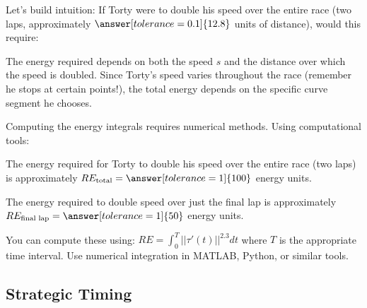 \documentclass{ximera}
\begin{document}
\begin{problem}
    Let's build intuition: If Torty were to double his speed over the entire race (two laps, approximately $\answer[tolerance=0.1]{12.8}$ units of distance), would this require:
    \begin{multipleChoice}
    \end{multipleChoice}
    
    \begin{feedback}
        The energy required depends on both the speed $s$ and the distance over which the speed is doubled. Since Torty's speed varies throughout the race (remember he stops at certain points!), the total energy depends on the specific curve segment he chooses.
    \end{feedback}
\end{problem}

\begin{problem}
    Computing the energy integrals requires numerical methods. Using computational tools:
    
    The energy required for Torty to double his speed over the entire race (two laps) is approximately $RE_{\text{total}}=\answer[tolerance=1]{100}$ energy units.
    
    The energy required to double speed over just the final lap is approximately $RE_{\text{final lap}}=\answer[tolerance=1]{50}$ energy units.
    
    \begin{feedback}
        You can compute these using: $RE=\int_0^{T} ||\tau'(t)||^{2.3}dt$ where $T$ is the appropriate time interval. Use numerical integration in MATLAB, Python, or similar tools.
    \end{feedback}
\end{problem}

\subsection*{Strategic Timing}
\end{document}
